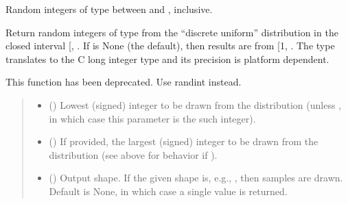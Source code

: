 \documentclass[letterpaper,10pt,english]{sphinxmanual}
\begin{document}
\begin{fulllineitems}
\label{\detokenize{metilda.controllers:metilda.controllers.pitch_art_wizard.random_integers}}
\pysigstartsignatures
{}
\pysigstopsignatures
\sphinxAtStartPar
Random integers of type  between  and , inclusive.

\sphinxAtStartPar
Return random integers of type  from the “discrete uniform”
distribution in the closed interval {[}, \sphinxtitleref{high}{]}.  If  is
None (the default), then results are from {[}1, \sphinxtitleref{low}{]}. The 
type translates to the C long integer type and its precision
is platform dependent.

\sphinxAtStartPar
This function has been deprecated. Use randint instead.

\sphinxAtStartPar
{}
\begin{quote}\begin{description}
\begin{itemize}
\item {} 
\sphinxAtStartPar
{} () \textendash{} Lowest (signed) integer to be drawn from the distribution (unless
, in which case this parameter is the  such
integer).

\item {} 
\sphinxAtStartPar
{} (\sphinxstyleliteralemphasis{\sphinxupquote{, }}) \textendash{} If provided, the largest (signed) integer to be drawn from the
distribution (see above for behavior if ).

\item {} 
\sphinxAtStartPar
{} (\sphinxstyleliteralemphasis{\sphinxupquote{, }}) \textendash{} Output shape.  If the given shape is, e.g., , then
 samples are drawn.  Default is None, in which case a
single value is returned.


\end{itemize}
\end{description}
\end{quote}
\end{fulllineitems}
\end{document}
